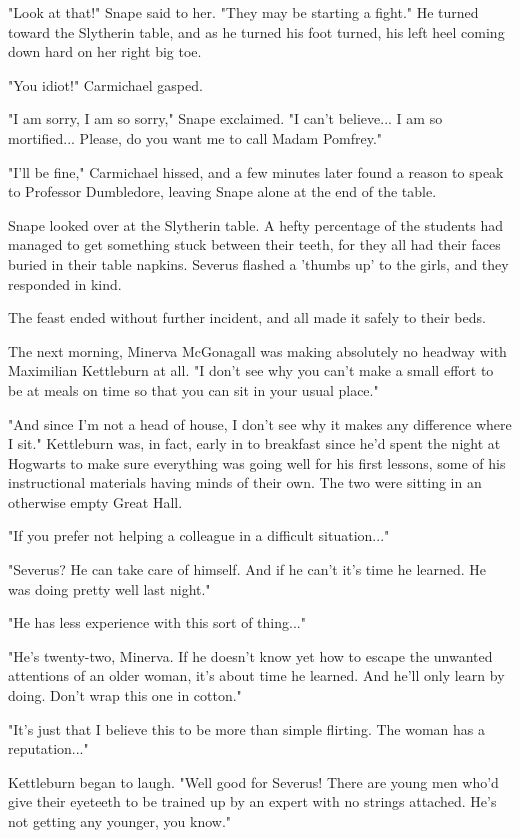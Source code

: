 \documentclass[a4paper,11pt]{article}
\begin{document}
"Look at that!" Snape said to her. "They may be starting a fight." He turned toward the Slytherin table, and as he turned his foot turned, his left heel coming down hard on her right big toe.

"You idiot!" Carmichael gasped.

"I am sorry, I am so sorry," Snape exclaimed. "I can't believe... I am so mortified... Please, do you want me to call Madam Pomfrey."

"I'll be fine," Carmichael hissed, and a few minutes later found a reason to speak to Professor Dumbledore, leaving Snape alone at the end of the table.

Snape looked over at the Slytherin table. A hefty percentage of the students had managed to get something stuck between their teeth, for they all had their faces buried in their table napkins. Severus flashed a 'thumbs up' to the girls, and they responded in kind.

The feast ended without further incident, and all made it safely to their beds.

The next morning, Minerva McGonagall was making absolutely no headway with Maximilian Kettleburn at all. "I don't see why you can't make a small effort to be at meals on time so that you can sit in your usual place."

"And since I'm not a head of house, I don't see why it makes any difference where I sit." Kettleburn was, in fact, early in to breakfast since he'd spent the night at Hogwarts to make sure everything was going well for his first lessons, some of his instructional materials having minds of their own. The two were sitting in an otherwise empty Great Hall.

"If you prefer not helping a colleague in a difficult situation..."

"Severus? He can take care of himself. And if he can't it's time he learned. He was doing pretty well last night."

"He has less experience with this sort of thing..."

"He's twenty-two, Minerva. If he doesn't know yet how to escape the unwanted attentions of an older woman, it's about time he learned. And he'll only learn by doing. Don't wrap this one in cotton."

"It's just that I believe this to be more than simple flirting. The woman has a reputation..."

Kettleburn began to laugh. "Well good for Severus! There are young men who'd give their eyeteeth to be trained up by an expert with no strings attached. He's not getting any younger, you know."
\end{document}
